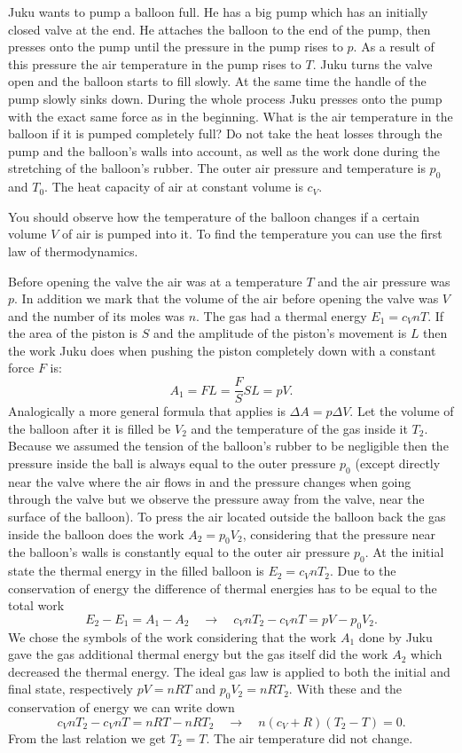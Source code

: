 Juku wants to pump a balloon full. He has a big pump which has an initially closed valve at the end. He attaches the balloon to the end of the pump, then presses onto the pump until the pressure in the pump rises to $p$. As a result of this pressure the air temperature in the pump rises to $T$. Juku turns the valve open and the balloon starts to fill slowly. At the same time the handle of the pump slowly sinks down. During the whole process Juku presses onto the pump with the exact same force as in the beginning. What is the air temperature in the balloon if it is pumped completely full? Do not take the heat losses through the pump and the balloon’s walls into account, as well as the work done during the stretching of the balloon’s rubber. The outer air pressure and temperature is $p_0$ and $T_0$. The heat capacity of air at constant volume is $c_V$.

\hinteng
You should observe how the temperature of the balloon changes if a certain volume $V$ of air is pumped into it. To find the temperature you can use the first law of thermodynamics.

\solueng
Before opening the valve the air was at a temperature $T$ and the air pressure was $p$. In addition we mark that the volume of the air before opening the valve was $V$ and the number of its moles was $n$. The gas had a thermal energy $E_1=c_VnT$. If the area of the piston is $S$ and the amplitude of the piston’s movement is $L$ then the work Juku does when pushing the piston completely down with a constant force $F$ is:
$$A_1=FL=\frac{F}{S}SL=pV.$$ 
Analogically a more general formula that applies is $\Delta A = p \Delta V$. Let the volume of the balloon after it is filled be $V_2$ and the temperature of the gas inside it $T_2$. Because we assumed the tension of the balloon’s rubber to be negligible then the pressure inside the ball is always equal to the outer pressure $p_0$ (except directly near the valve where the air flows in and the pressure changes when going through the valve but we observe the pressure away from the valve, near the surface of the balloon). To press the air located outside the balloon back the gas inside the balloon does the work $A_2=p_0V_2$, considering that the pressure near the balloon’s walls is constantly equal to the outer air pressure $p_0$. At the initial state the thermal energy in the filled balloon is $E_2=c_VnT_2$. Due to the conservation of energy the difference of thermal energies has to be equal to the total work
$$E_2-E_1 = A_1-A_2 \quad\rightarrow\quad c_VnT_2-c_VnT = pV - p_0V_2.$$ 
We chose the symbols of the work considering that the work $A_1$ done by Juku gave the gas additional thermal energy but the gas itself did the work $A_2$ which decreased the thermal energy. The ideal gas law is applied to both the initial and final state, respectively $pV=nRT$ and $p_0V_2=nRT_2$. With these and the conservation of energy we can write down
$$c_VnT_2-c_VnT = nRT-nRT_2 \quad\rightarrow\quad n(c_V+R)(T_2-T)=0.$$ 
From the last relation we get $T_2=T$. The air temperature did not change.
\probend